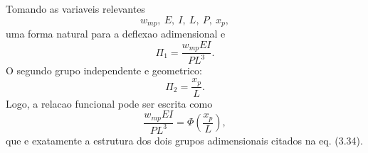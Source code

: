 Tomando as variaveis relevantes
\[
w_{mp},\ E,\ I,\ L,\ P,\ x_p,
\]
uma forma natural para a deflexao adimensional e
\[
\Pi_1 = \frac{w_{mp}EI}{PL^3}.
\]
O segundo grupo independente e geometrico:
\[
\Pi_2 = \frac{x_p}{L}.
\]
Logo, a relacao funcional pode ser escrita como
\[
\frac{w_{mp}EI}{PL^3} = \Phi\!\left(\frac{x_p}{L}\right),
\]
que e exatamente a estrutura dos dois grupos adimensionais citados na eq. (3.34).

